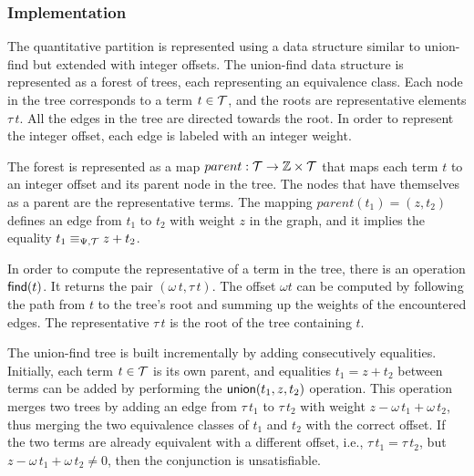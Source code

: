 \subsubsection{Implementation}

The quantitative partition is represented using a data structure similar to union-find but extended with integer offsets.
The union-find data structure is represented as a forest of trees, each representing an equivalence class.
Each node in the tree corresponds to a term $t \in \mathcal{T}$, and the roots are representative elements $\tau\,t$.\cite{uf-tarjan}
All the edges in the tree are directed towards the root.
In order to represent the integer offset, each edge is labeled with an integer weight.

The forest is represented as a map $parent : \mathcal{T} \rightarrow \mathbb{Z} \times \mathcal{T}$ that maps each term $t$ to an integer offset and its parent node in the tree.
The nodes that have themselves as a parent are the representative terms.
The mapping $parent(t_1) = (z,t_2)$ defines an edge from $t_1$ to $t_2$ with weight $z$ in the graph, and it implies the equality $t_1 \equiv_{\Psi,\mathcal{T}} z + t_2$.

In order to compute the representative of a term in the tree, there is an operation $\textsf{find}(t)$.
It returns the pair $(\omega\,t,\tau\,t)$.
The offset $\omega t$ can be computed by following the path from $t$ to the tree's root and summing up the weights of the encountered edges.
The representative $\tau\,t$ is the root of the tree containing $t$.

The union-find tree is built incrementally by adding consecutively equalities.
Initially, each term $t\in\mathcal{T}$ is its own parent, and equalities $t_1 = z + t_2$ between terms can be added by performing the $\textsf{union}(t_1, z, t_2)$ operation.
This operation merges two trees by adding an edge from $\tau\,t_1$ to $\tau\,t_2$ with weight $z - \omega\,t_1 + \omega\,t_2$,
thus merging the two equivalence classes of $t_1$ and $t_2$ with the correct offset.
If the two terms are already equivalent with a different offset, i.e., $\tau\,t_1 = \tau\,t_2$, but $z - \omega\,t_1 + \omega\,t_2 \neq 0$, then the conjunction is unsatisfiable.

